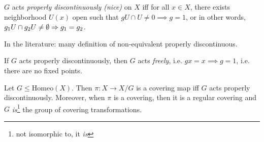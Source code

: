 \begin{definition}
    $G$ acts \emph{properly discontinuously (nice)} on $X$ iff for all $x \in X$, there exists neighborhood $U(x)$ open such that $g U \cap U \neq 0 \implies g = 1$, or in other words, $g_1U \cap  g_2 U \neq \emptyset \Rightarrow g_1 = g_2$.
\end{definition}
\begin{remark}
    In the literature: many definition of non-equivalent properly discontinuous.
\end{remark}
\begin{remark}
    If $G$ acts properly discontinuously, then $G$ acts \emph{freely}, i.e. $gx = x \implies g = 1$, i.e. there are no fixed points.
\end{remark}
\begin{theorem}[76.5, important!]
    Let $G \le  \text{Homeo}(X)$.
    Then $\pi: X \to X / G$ is a covering map iff $G$ acts properly discontinuously.
    Moreover, when $\pi$ is a covering, then it is a regular covering and $G$ \emph{is}\footnote{not isomorphic to, it \emph{is}} the group of covering transformations.
\end{theorem}
